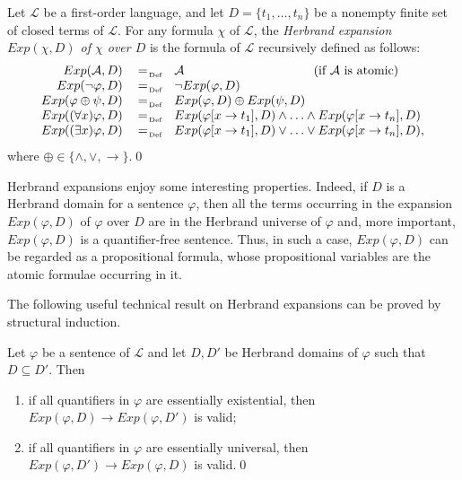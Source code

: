 \documentclass[a4paper]{llncs}
\newcommand{\Lang}{\ensuremath{\mathcal{L}\xspace}} %
\newcommand{\LangPreds}{\Preds_{\Lang}}
\newcommand{\LangTerms}{\Terms_{\Lang}}
\newcommand{\HExp}{Exp}
\newcommand{\subst}[3]{#1[#2\rightarrow#3]}
\begin{document}
\begin{definition}\label{EXP}
Let $\Lang$ be a first-order language, and let $D=\{t_1, \ldots, 
t_n\}$ be a nonempty finite set of closed terms of $\Lang$. For any 
formula $\chi$ of $\Lang$, the \emph{Herbrand expansion  $\HExp(\chi, 
D)$ of $\chi$ over $D$} is the formula of $\Lang$ recursively defined 
as follows:
%
\[
  \begin{array}{rcll}
  \HExp(\mathcal{A}, D) & \defAs & 
\mathcal{A}\qquad\qquad\qquad\qquad~\qquad\text{(if $\mathcal{A}$ is 
atomic)}  \\
  \HExp(\neg \varphi, D) & \defAs & \neg\HExp(\varphi, D) \\
  \HExp(\varphi \oplus \psi, D) & \defAs & \HExp(\varphi, D) \oplus 
\HExp(\psi, D)\\
  \HExp((\forall x)\varphi, D) & \defAs & 
\HExp(\subst{\varphi}{x}{t_1}, D) \wedge \ldots \wedge 
\HExp(\subst{\varphi}{x}{t_n}, D)\\
  \HExp((\exists x)\varphi, D) & \defAs & \HExp(\subst{\varphi}{x}{t_1}, D) \vee 
\ldots \vee \HExp(\subst{\varphi}{x}{t_n}, D),\\
  \end{array}
\]
where $\oplus \in \{\wedge, \vee, \rightarrow\}$.\qed
%
\end{definition}

Herbrand expansions enjoy some interesting properties. Indeed, if $D$ 
is a Herbrand domain for a sentence $\varphi$, then all the terms 
occurring in the expansion $\HExp(\varphi, D)$ of
$\varphi$ over $D$ are in the Herbrand universe of $\varphi$ and, more
important, $\HExp(\varphi, D)$ is a
quantifier-free sentence.
Thus, in such a case, $\HExp(\varphi, D)$ can be regarded as a propositional
formula, whose propositional variables are the atomic formulae occurring in it.

The following useful technical result on Herbrand expansions can be 
proved by structural induction.
\begin{lemma}\label{le:Exp}
Let $\varphi$ be a sentence of $\Lang$ and let $D, D'$ be Herbrand 
domains of $\varphi$ such that $D \subseteq D'$. Then
\begin{enumerate}[label=(\alph*)]
\item\label{le:Expa} if all quantifiers in $\varphi$ are essentially 
existential, then $\HExp(\varphi, D) \rightarrow \HExp(\varphi, D')$ 
is valid;

\item\label{le:Expb} if all quantifiers in $\varphi$ are essentially 
universal, then $\HExp(\varphi, D') \rightarrow \HExp(\varphi, D)$ is 
valid.\qed
\end{enumerate}
\end{lemma}
\end{document}
